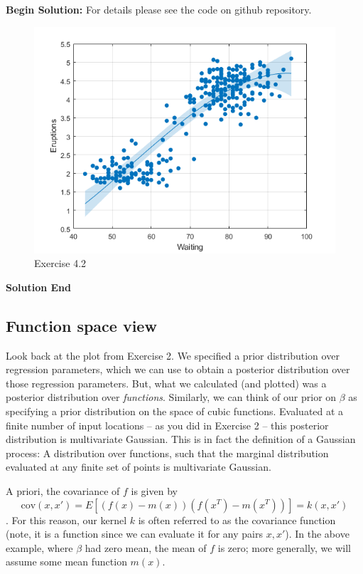 \documentclass[twoside]{article}
\newcommand\cov{\mbox{cov}}
\begin{document}
\textbf{Begin Solution:}
For details please see the code on github repository.
\begin{figure}[H]
\begin{center}
\includegraphics[width=\textwidth]{./Exercise42/Exercise42.png}
\end{center}
\caption{Exercise 4.2}
\end{figure} 
\textbf{Solution End}

\subsection{Function space view}

Look back at the plot from Exercise 2. We specified a prior distribution over regression parameters, which we can use to obtain a posterior distribution over those regression parameters. But, what we calculated (and plotted) was a posterior distribution over \textit{functions}. Similarly, we can think of our prior on $\beta$ as specifying a prior distribution on the space of cubic functions. Evaluated at a finite number of input locations -- as you did in Exercise 2 -- this posterior distribution is multivariate Gaussian. This is in fact the definition of a Gaussian process: A distribution over functions, such that the marginal distribution evaluated at any finite set of points is multivariate Gaussian.

A priori, the  covariance of $f$ is given by $$\cov(x,x') = E[(f(x)-m(x))(f(x^T)-m(x^T))] = k(x,x')$$. For this reason, our kernel $k$ is often referred to as the covariance function (note, it is a function since we can evaluate it for any pairs $x,x'$). In the above example, where $\beta$ had zero mean, the mean of $f$ is zero; more generally, we will assume some mean function $m(x)$.
\end{document}
